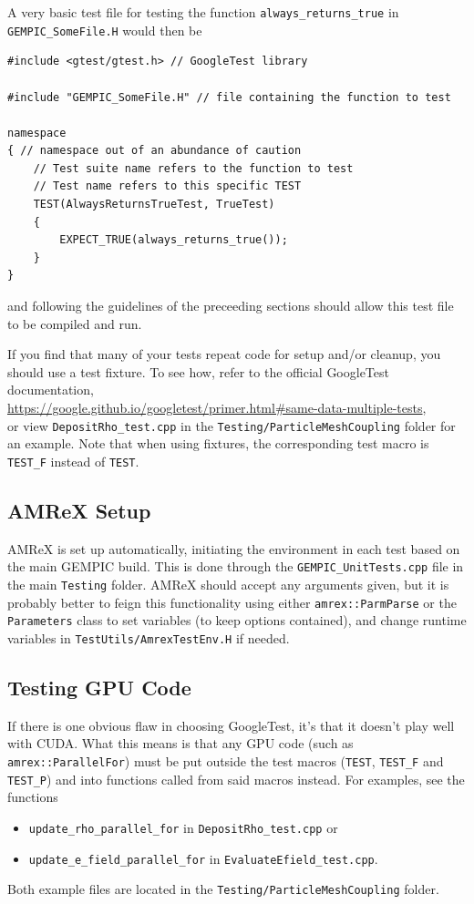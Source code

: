 \documentclass[11pt]{article}
\newcommand{\gt}{GoogleTest}
\newcommand{\pmc}{\texttt{Testing/ParticleMeshCoupling}}
\newcommand{\main}{main \texttt{Testing}}
\newcommand\loc[1]{in the #1 folder}
\begin{document}
 A very basic test file for testing the function \lstinline{always_returns_true} in \verb|GEMPIC_SomeFile.H| would then be
\begin{lstlisting}
#include <gtest/gtest.h> // GoogleTest library

#include "GEMPIC_SomeFile.H" // file containing the function to test

namespace
{ // namespace out of an abundance of caution
    // Test suite name refers to the function to test
    // Test name refers to this specific TEST
    TEST(AlwaysReturnsTrueTest, TrueTest)
    {
        EXPECT_TRUE(always_returns_true());
    }
}
\end{lstlisting}
 and following the guidelines of the preceeding sections should allow this test file to be compiled and run.

 If you find that many of your tests repeat code for setup and/or cleanup, you should use a test fixture. To see how, refer to the official \gt{} documentation,
 \\\url{https://google.github.io/googletest/primer.html#same-data-multiple-tests},\\
 or view \verb|DepositRho_test.cpp| \loc{\pmc} for an example. Note that when using fixtures, the corresponding test macro is \lstinline{TEST_F} instead of \lstinline{TEST}.

\subsection{AMReX Setup}
AMReX is set up automatically, initiating the environment in each test based on the main GEMPIC build. This is done through the \verb|GEMPIC_UnitTests.cpp| file \loc{\main}.
AMReX should accept any arguments given, but it is probably better to feign this functionality using either \lstinline{amrex::ParmParse} or the \lstinline{Parameters} class to set variables (to keep options contained), and change runtime variables in \verb|TestUtils/AmrexTestEnv.H| if needed.

\subsection{Testing GPU Code}\label{sec:testing-gpu-code}
If there is one obvious flaw in choosing \gt, it's that it doesn't play well with CUDA. What this means is that any GPU code (such as \lstinline{amrex::ParallelFor}) must be put outside the test macros (\lstinline{TEST}, \lstinline{TEST_F} and \lstinline{TEST_P}) and into functions called from said macros instead. For examples, see the functions
\begin{itemize} 
    \item \lstinline{update_rho_parallel_for} in \verb|DepositRho_test.cpp| or 
    \item \lstinline{update_e_field_parallel_for} in \verb|EvaluateEfield_test.cpp|.
\end{itemize}
Both example files are located \loc{\pmc}.
\end{document}
